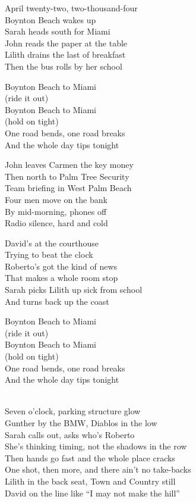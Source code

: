 \begin{lyrics}

April twenty-two, two-thousand-four\\
Boynton Beach wakes up\\
Sarah heads south for Miami\\
John reads the paper at the table\\
Lilith drains the last of breakfast\\
Then the bus rolls by her school

Boynton Beach to Miami\\
(ride it out)\\
Boynton Beach to Miami\\
(hold on tight)\\
One road bends, one road breaks\\
And the whole day tips tonight

John leaves Carmen the key money\\
Then north to Palm Tree Security\\
Team briefing in West Palm Beach\\
Four men move on the bank\\
By mid-morning, phones off\\
Radio silence, hard and cold

David’s at the courthouse\\
Trying to beat the clock\\
Roberto’s got the kind of news\\
That makes a whole room stop\\
Sarah picks Lilith up sick from school\\
And turns back up the coast

Boynton Beach to Miami\\
(ride it out)\\
Boynton Beach to Miami\\
(hold on tight)\\
One road bends, one road breaks\\
And the whole day tips tonight

\\
Seven o’clock, parking structure glow\\
Gunther by the BMW, Diablos in the low\\
Sarah calls out, asks who’s Roberto\\
She’s thinking timing, not the shadows in the row\\
Then hands go fast and the whole place cracks\\
One shot, then more, and there ain’t no take-backs\\
Lilith in the back seat, Town and Country still\\
David on the line like “I may not make the hill”


\end{lyrics}
